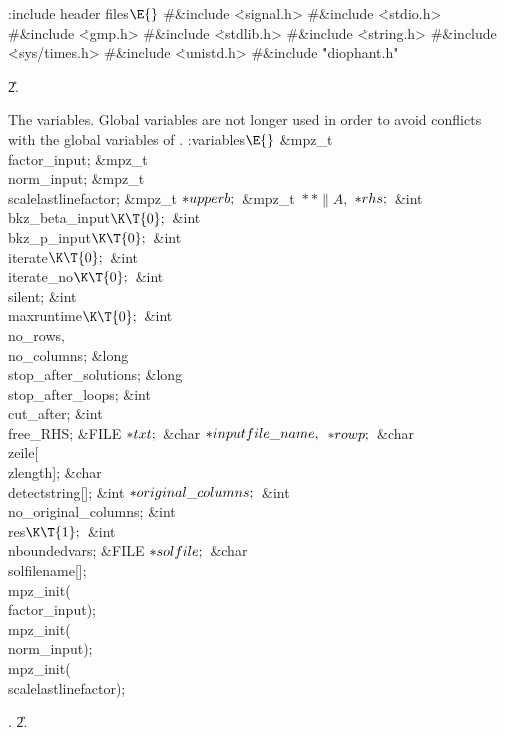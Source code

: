 \B{}:include header files\X${}\E{}$\6
\8\#\&{include} \.{<signal.h>}\6
\8\#\&{include} \.{<stdio.h>}\6
\8\#\&{include} \.{<gmp.h>}\6
\8\#\&{include} \.{<stdlib.h>}\6
\8\#\&{include} \.{<string.h>}\6
\8\#\&{include} \.{<sys/times.h>}\6
\8\#\&{include} \.{<unistd.h>}\6
\8\#\&{include} \.{"diophant.h"}\par
\U2.\fi

The variables. Global variables are not longer used in order to avoid
conflicts with the global variables of .
\Y\B\4:variables\X${}\E{}$\6
\&{mpz\_t} \\{factor\_input};\6
\&{mpz\_t} \\{norm\_input};\6
\&{mpz\_t} \\{scalelastlinefactor};\6
\&{mpz\_t} ${}{*}\\{upperb};{}$\6
\&{mpz\_t} ${}{*}{*}\|A,{}$ ${}{*}\\{rhs};{}$\6
\&{int} \\{bkz\_beta\_input}${}\K\T{0};{}$\6
\&{int} \\{bkz\_p\_input}${}\K\T{0};{}$\6
\&{int} \\{iterate}${}\K\T{0};{}$\6
\&{int} \\{iterate\_no}${}\K\T{0};{}$\6
\&{int} \\{silent};\6
\&{int} \\{maxruntime}${}\K\T{0};{}$\6
\&{int} \\{no\_rows}${},{}$ \\{no\_columns};\6
\&{long} \\{stop\_after\_solutions};\6
\&{long} \\{stop\_after\_loops};\6
\&{int} \\{cut\_after};\6
\&{int} \\{free\_RHS};\6
\&{FILE} ${}{*}\\{txt};{}$\6
\&{char} ${}{*}\\{inputfile\_name},{}$ ${}{*}\\{rowp};{}$\6
\&{char} \\{zeile}[\\{zlength}];\6
\&{char} \\{detectstring}[];\6
\&{int} ${}{*}\\{original\_columns};{}$\6
\&{int} \\{no\_original\_columns};\6
\&{int} \\{res}${}\K\T{1};{}$\6
\&{int} \\{nboundedvars};\6
\&{FILE} ${}{*}\\{solfile};{}$\6
\&{char} \\{solfilename}[];\7
\\{mpz\_init}(\\{factor\_input});\6
\\{mpz\_init}(\\{norm\_input});\6
\\{mpz\_init}(\\{scalelastlinefactor});\par
{}.
\U2.\fi


